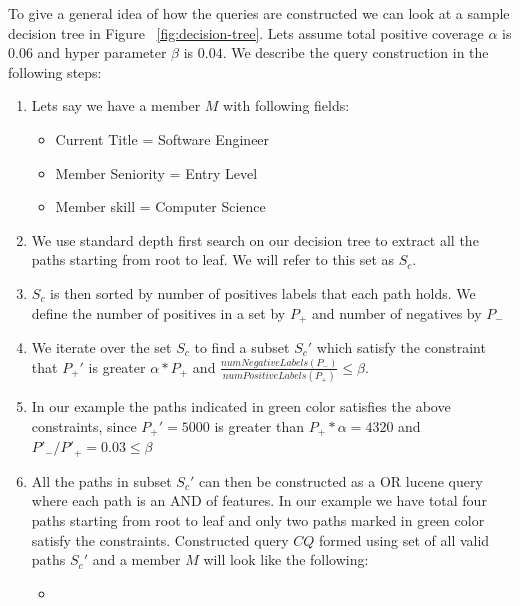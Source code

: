 To give a general idea of how the queries are constructed we can look at a sample decision tree in Figure ~\ref{fig:decision-tree}.
Lets assume total positive coverage $\alpha$ is $0.06$ and hyper parameter $\beta$ is $0.04$. We describe the query construction in the following steps: 

\begin{enumerate}
    \item Lets say we have a member $M$ with following fields:
    \begin{itemize}
    \item Current Title = Software Engineer
    \item Member Seniority = Entry Level
    \item Member skill = Computer Science
    \end{itemize}
    \item We use standard depth first search on our decision tree  to extract all the paths starting from root to leaf. We will refer to this set as $S_c$.
    \item $S_c$ is then sorted by number of positives labels that each path holds. We define the number of positives in a set by $P_+$ and number of negatives by $P_-$
    \item We iterate over the set $S_c$ to find a subset $S_c'$ which satisfy the constraint that $P_+'$ is greater $\alpha * P_+$ and $\frac{numNegativeLabels(P_{-})}{numPositiveLabels(P_{+})} \leq \beta$. 
    \item In our example the paths indicated in green color satisfies the above constraints, since $P_+'= 5000$  is greater than $P_+ * \alpha = 4320$ and  $P'_-/P'_+ = 0.03 \leq \beta$
    \item All the paths in subset $S_c'$ can then be constructed as a OR lucene query where each path is an AND of features. In our example we have total four paths starting from root to leaf and only two paths marked in green color satisfy the constraints. Constructed query $CQ$  formed  using set of all valid paths $S_c'$ and  a member $M$ will look like the following: 
    \begin{itemize}
    \item {}
    \end{itemize}
    
\end{enumerate}

